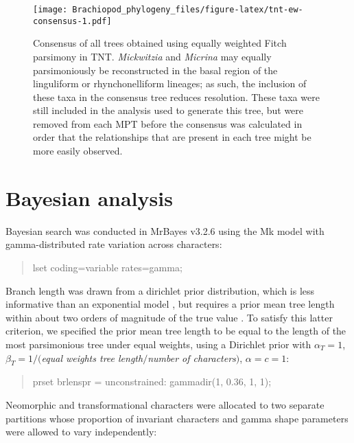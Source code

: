 \documentclass[openany]{book}
\theoremstyle{definition}
\theoremstyle{definition}
\theoremstyle{definition}
\theoremstyle{remark}
\begin{document}
\newpage










\begin{figure}
\centering
\texttt{[image: Brachiopod\_phylogeny\_files/figure-latex/tnt-ew-consensus-1.pdf]}
\caption{\label{fig:tnt-ew-consensus}Consensus of all trees obtained using equally weighted
Fitch parsimony in TNT. \emph{Mickwitzia} and \emph{Micrina} may equally
parsimoniously be reconstructed in the basal region of the linguliform
or rhynchonelliform lineages; as such, the inclusion of these taxa in
the consensus tree reduces resolution. These taxa were still included in
the analysis used to generate this tree, but were removed from each MPT
before the consensus was calculated in order that the relationships that
are present in each tree might be more easily observed.}
\end{figure}

\hypertarget{bayesian}{\chapter{Bayesian analysis}\label{bayesian}}

Bayesian search was conducted in MrBayes v3.2.6 \citep{Ronquist2012}
using the Mk model \citep{Lewis2001} with gamma-distributed rate
variation across characters:

\begin{quote}
lset coding=variable rates=gamma;
\end{quote}

Branch length was drawn from a dirichlet prior distribution, which is
less informative than an exponential model \citep{Rannala2012}, but
requires a prior mean tree length within about two orders of magnitude
of the true value \citep{Zhang2012}. To satisfy this latter criterion,
we specified the prior mean tree length to be equal to the length of the
most parsimonious tree under equal weights, using a Dirichlet prior with
\(\alpha_T = 1\), \(\beta_T = 1/(\)\emph{equal weights tree
length}\(/\)\emph{number of characters}\()\), \(\alpha = c = 1\):

\begin{quote}
prset brlenspr = unconstrained: gammadir(1, 0.36, 1, 1);
\end{quote}

Neomorphic and transformational characters
\citep[\emph{sensu}][]{Sereno2007} were allocated to two separate
partitions whose proportion of invariant characters and gamma shape
parameters were allowed to vary independently:
\end{document}
